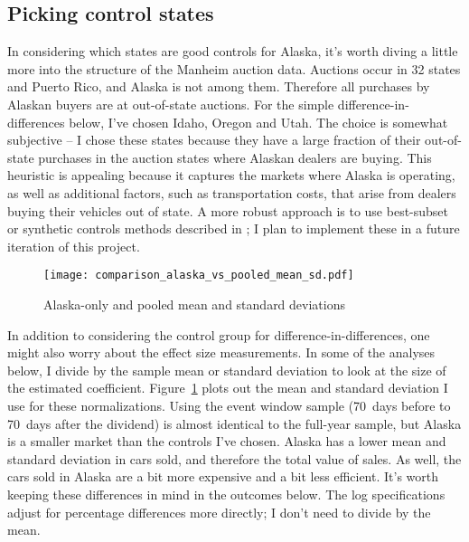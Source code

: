 \documentclass[11pt,letterpaper,oneside]{article}
\begin{document}
\begin{doublespacing}
\subsection{Picking control states}
\label{sec:picking-controls}
In considering which states are good controls for Alaska, it's worth diving a little more into the structure of the Manheim auction data.
Auctions occur in 32 states and Puerto Rico, and Alaska is not among them.
Therefore all purchases by Alaskan buyers are at out\hyp{}of\hyp{}state auctions.
For the simple difference\hyp{}in\hyp{}differences below, I've chosen Idaho, Oregon and Utah.
The choice is somewhat subjective -- I chose these states because they have a large fraction of their out\hyp{}of\hyp{}state purchases in the auction states where Alaskan dealers are buying.
This heuristic is appealing because it captures the markets where Alaska is operating, as well as additional factors, such as transportation costs, that arise from dealers buying their vehicles out of state.
A more robust approach is to use best\hyp{}subset or synthetic controls methods described in \textcite{DoudchenkoImbens2016DD}; I plan to implement these in a future iteration of this project.

\begin{figure}[bth]
	\caption{Alaska-only and pooled mean and standard deviations}
	\label{fig:alaska_vs_pooled_mean_sd}
	\texttt{[image: comparison\_alaska\_vs\_pooled\_mean\_sd.pdf]}
\end{figure}

In addition to considering the control group for difference\hyp{}in\hyp{}differences, one might also worry about the effect size measurements.
In some of the analyses below, I divide by the sample mean or standard deviation to look at the size of the estimated coefficient.
Figure~\ref{fig:alaska_vs_pooled_mean_sd} plots out the mean and standard deviation I use for these normalizations.
Using the event window sample (70~days before to 70~days after the dividend) is almost identical to the full\hyp{}year sample, but Alaska is a smaller market than the controls I've chosen.
Alaska has a lower mean and standard deviation in cars sold, and therefore the total value of sales.
As well, the cars sold in Alaska are a bit more expensive and a bit less efficient.
It's worth keeping these differences in mind in the outcomes below.
The log specifications adjust for percentage differences more directly; I don't need to divide by the mean.


\end{doublespacing}
\end{document}
